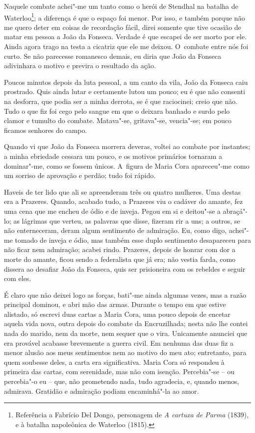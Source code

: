 Naquele combate achei"-me um tanto como o herói de Stendhal na batalha de
Waterloo\footnote{Referência a Fabrício Del Dongo, personagem de \emph{A
  cartuxa de Parma} (1839), e à batalha napoleônica de Waterloo (1815).};
a diferença é que o espaço foi menor. Por isso, e também porque não me
quero deter em coisas de recordação fácil, direi somente que tive
ocasião de matar em pessoa a João da Fonseca. Verdade é que escapei de
ser morto por ele. Ainda agora trago na testa a cicatriz que ele me
deixou. O~combate entre nós foi curto. Se não parecesse romanesco
demais, eu diria que João da Fonseca adivinhara o motivo e previra o
resultado da ação.

Poucos minutos depois da luta pessoal, a um canto da vila, João da
Fonseca caiu prostrado. Quis ainda lutar e certamente lutou um pouco; eu
é que não consenti na desforra, que podia ser a minha derrota, se é que
raciocinei; creio que não. Tudo o que fiz foi cego pelo sangue em que o
deixara banhado e surdo pelo clamor e tumulto do combate. Matava"-se,
gritava"-se, vencia"-se; em pouco ficamos senhores do campo.

Quando vi que João da Fonseca morrera deveras, voltei ao combate por
instantes; a minha ebriedade cessara um pouco, e os motivos primários
tornaram a dominar"-me, como se fossem únicos. A~figura de Maria Cora
apareceu"-me como um sorriso de aprovação e perdão; tudo foi rápido.

Haveis de ter lido que ali se apreenderam três ou quatro mulheres. Uma
destas era a Prazeres. Quando, acabado tudo, a Prazeres viu o cadáver do
amante, fez uma cena que me encheu de ódio e de inveja. Pegou em si e
deitou"-se a abraçá"-lo; as lágrimas que verteu, as palavras que disse,
fizeram rir a uns; a outros, se não enterneceram, deram algum sentimento
de admiração. Eu, como digo, achei"-me tomado de inveja e ódio, mas
também esse duplo sentimento desapareceu para não ficar nem admiração;
acabei rindo. Prazeres, depois de honrar com dor a morte do amante,
ficou sendo a federalista que já era; não vestia farda, como dissera ao
desafiar João da Fonseca, quis ser prisioneira com os rebeldes e seguir
com eles.

É claro que não deixei logo as forças, bati"-me ainda algumas vezes, mas
a razão principal dominou, e abri mão das armas. Durante o tempo em que
estive alistado, só escrevi duas cartas a Maria Cora, uma pouco depois
de encetar aquela vida nova, outra depois do combate da Encruzilhada;
nesta não lhe contei nada do marido, nem da morte, nem sequer que o
vira. Unicamente anunciei que era provável acabasse brevemente a guerra
civil. Em nenhuma das duas fiz a menor alusão aos meus sentimentos nem
ao motivo do meu ato; entretanto, para quem soubesse deles, a carta era
significativa. Maria Cora só respondeu à primeira das cartas, com
serenidade, mas não com isenção. Percebia"-se -- ou percebia"-o eu -- que,
não prometendo nada, tudo agradecia, e, quando menos, admirava. Gratidão
e admiração podiam encaminhá"-la ao amor.

